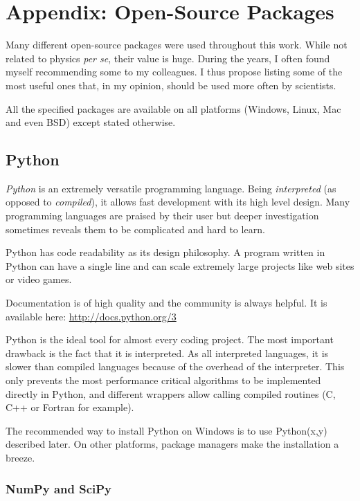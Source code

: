 \section{Appendix: Open-Source Packages}
\label{appendix:oss}

Many different open-source packages were used throughout this work. While not
related to physics \textit{per se}, their value is huge. During the years, I
often found myself recommending some to my colleagues. I thus propose listing
some of the most useful ones that, in my opinion, should be used more often
by scientists.

All the specified packages are available on all platforms (Windows, Linux, Mac
and even BSD) except stated otherwise.


\subsection*{Python}

\textit{Python} is an extremely versatile programming language. Being \textit{interpreted}
(as opposed to \textit{compiled}), it allows fast development with its high
level design. Many programming languages are praised by their user but deeper
investigation sometimes reveals them to be complicated and hard to learn.

Python has code readability as its design philosophy.
A program written in Python can have a single line and can scale extremely
large projects like web sites or video games.

Documentation is of high quality and the community is always helpful. It is
available here: \url{http://docs.python.org/3}

Python is the ideal tool for almost every coding project. The most
important drawback is the fact that it is interpreted. As all interpreted
languages, it is slower than compiled languages because of the overhead of the
interpreter. This only prevents the most performance critical algorithms to be
implemented directly in Python, and different wrappers allow calling compiled
routines (C, C++ or Fortran for example).

The recommended way to install Python on Windows is to use Python(x,y) described
later. On other platforms, package managers make the installation a breeze.


\subsubsection*{NumPy and SciPy}

